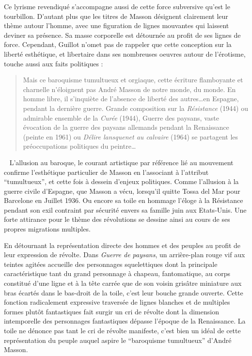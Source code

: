 
Ce lyrisme revendiqué s’accompagne aussi de cette force subversive qu’est le tourbillon. D’autant plus que les titres de Masson désignent clairement leur thème autour l’homme, avec une figuration de lignes mouvantes qui laissent deviner sa présence. Sa masse corporelle est détournée au profit de ses lignes de force. Cependant, Guillot n’omet pas de rappeler que cette conception sur la liberté esthétique, et libertaire dans ses nombreuses oeuvres autour de l’érotisme, touche aussi aux faits politiques : 

\begin{quote}
Mais ce baroquisme tumultueux et orgiaque, cette écriture flamboyante et charnelle n’éloignent pas André Masson de notre monde, du monde. En homme libre, il s’inquiète de l’absence de liberté des autres…en Espagne, pendant la dernière guerre. Grande composition sur la \emph{Résistance} (1944) ou admirable ensemble de la \emph{Curée} (1944), Guerre des paysans, vaste évocation de la guerre des paysans allemands pendant la Renaissance (peinte en 1961) ou \emph{Délire lansquenet au calvaire} (1964) se partagent les préoccupations politiques du peintre…	
\end{quote}
 
	L’allusion au baroque, le courant artistique par référence lié au mouvement confirme l’esthétique particulier de Masson en l’associant à l’attribut \enquote{tumultueux}, et cette fois à dessein d’enjeux politiques. Comme l’allusion à la guerre civile d’Espagne, que Masson a vécu, lorsqu’il quitte Tossa del Mar pour Barcelone en Juillet 1936. Ou encore sa toile en hommage l’éloge à la Résistance pendant son exil contraint par sécurité envers sa famille juin aux Etats-Unis. Une forte attirance pour le thème des révolutions se dessine ainsi au cours de ses propres migrations multiples. 

En détournant la représentation directe des hommes et des peuples au profit de leur expression de révolte. Dans \emph{Guerre de paysans}, un arrière-plan rouge vif aux teintes agitées accueille des personnages squelettiques dont la principale caractéristique tant du grand personnage à chapeau, fantomatique, au corps constitué d’une ligne et à la tête carrée que de son voisin grisâtre miniature aux bras écartés dans le bas-droit de la toile, c’est leur bouche grande ouverte. Cette fonction radicalement expressive traversée de lignes blanches et de multiples formes plutôt fantastiques fait surgir un cri de révolte dont la dimension intemporelle des personnages fantastiques dépasse l’époque de la Renaissance. La toile ne dénonce pas tant le cri de révolte manifeste, c’est bien un idéal de cette représentation du peuple auquel aspire le \enquote{baroquisme tumultueux} d’André Masson.

